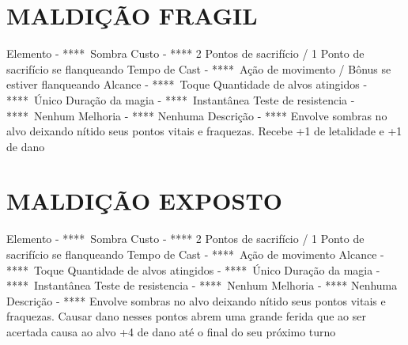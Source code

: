 \documentclass{article}%
\begin{document}
%
\section{MALDIÇÃO FRAGIL}%
\label{sec:MALDIOFRAGIL}%
Elemento {-} ****~Sombra\newline%
Custo {-} **** 2 Pontos de sacrifício / 1 Ponto de sacrifício se flanqueando\newline%
Tempo de Cast {-} ****~Ação de movimento / Bônus se estiver flanqueando\newline%
Alcance {-} ****~Toque\newline%
Quantidade de alvos atingidos {-} ****~Único\newline%
Duração da magia {-} ****~Instantânea\newline%
Teste de resistencia {-} ****~Nenhum\newline%
Melhoria {-} **** Nenhuma\newline%
Descrição {-} **** Envolve sombras no alvo deixando nítido seus pontos vitais e fraquezas. Recebe +1 de letalidade e +1 de dano\newline%

%
\section{MALDIÇÃO EXPOSTO}%
\label{sec:MALDIOEXPOSTO}%
Elemento {-} ****~Sombra\newline%
Custo {-} **** 2 Pontos de sacrifício / 1 Ponto de sacrifício se flanqueando\newline%
Tempo de Cast {-} ****~Ação de movimento\newline%
Alcance {-} ****~Toque\newline%
Quantidade de alvos atingidos {-} ****~Único\newline%
Duração da magia {-} ****~Instantânea\newline%
Teste de resistencia {-} ****~Nenhum\newline%
Melhoria {-} **** Nenhuma\newline%
Descrição {-} **** Envolve sombras no alvo deixando nítido seus pontos vitais e fraquezas. Causar dano nesses pontos abrem uma grande ferida que ao ser acertada causa ao alvo +4 de dano até o final do seu próximo turno\newline%

%
\end{document}
